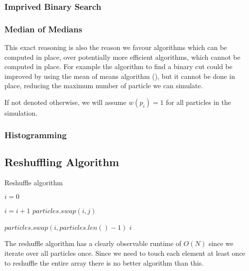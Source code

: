 \documentclass[]{article}
\begin{document}
\subsubsection{Imprived Binary Search}


\subsubsection{Median of Medians}
This exact reasoning is also the reason we favour algorithms which can be computed in place, over potentially more efficient algorithms, which cannot be computed in place. For example the algorithm to find a binary cut could be improved by using the mean of means algorithm (), but it cannot be done in place, reducing the maximum number of particle we can simulate. 

If not denoted otherwise, we will assume $w(p_i) = 1$ for all particles in the simulation.


\subsubsection{Histogramming}




\subsection{Reshuffling Algorithm}

\begin{algorithm}[H]
	\caption{Reshuffle algorithm}\label{euclid}
	\begin{algorithmic}[1]
		\State $i = 0$
		
		\State $i = i + 1$
		\State $particles.swap(i,j)$
		\EndIf
		\EndFor
		
		\State $particles.swap(i,particles.len() - 1)$
		\State \Return $i$
		\EndProcedure
	\end{algorithmic}
\end{algorithm}

The reshuffle algorithm has a clearly observable runtime of $O(N)$ since we iterate over all particles once. Since we need to touch each element at least once to reshuffle the entire array there is no better algorithm than this.
\end{document}
